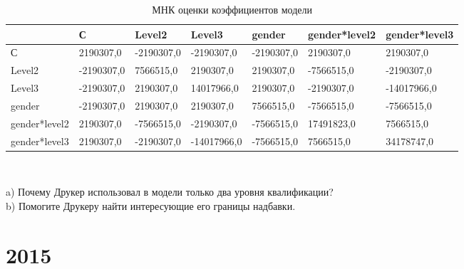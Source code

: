 \documentclass[addpoints, answers]{exam} %
\begin{document}
\begin{questions}
\begin{parts}
\begin{table}[H]
\caption{МНК оценки коэффициентов модели}
\begin{tabular}{|m{2cm}|m{2cm}|m{2cm}|m{2cm}|m{2cm}|m{2cm}|m{2cm}|}
  \hline
     &    С  &  Level2  &  Level3  &   gender &   gender*level2 & gender*level3\\
  \hline
  С  &  2190307,0 &  -2190307,0&  -2190307,0  &  -2190307,0 &  2190307,0 &  2190307,0\\
   \hline
   Level2 &-2190307,0  &  7566515,0& 2190307,0  & 2190307,0  & -7566515,0  &  -2190307,0\\
   \hline
    Level3&-2190307,0  &  2190307,0 &  14017966,0 & 2190307,0  &-2190307,0   &  -14017966,0\\
   \hline
    gender&-2190307,0   &  2190307,0&  2190307,0 &  7566515,0 &  -7566515,0 &  -7566515,0\\
   \hline
    gender*level2& 2190307,0 & -7566515,0   &  -2190307,0&  -7566515,0 &  17491823,0 &  7566515,0\\
   \hline
    gender*level3& 2190307,0 & -2190307,0   &  -14017966,0&  -7566515,0 &  7566515,0 &  34178747,0\\
   \hline
\end{tabular} \\
\end{table}

a) Почему Друкер использовал в модели только два уровня квалификации?\\
b) Помогите Друкеру найти интересующие его границы надбавки.
\end{parts}
\end{questions}
\newpage
\section{2015}
\end{document}
